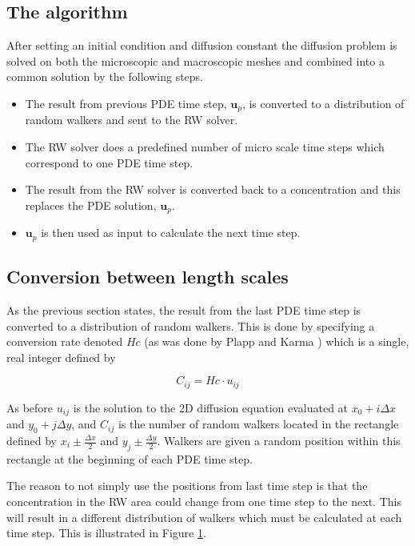 \subsection{The algorithm}
After setting an initial condition and diffusion constant the diffusion problem is solved on both the microscopic and macroscopic meshes and combined into a common solution by the following steps.
\begin{itemize}
 \item The result from previous PDE time step, $\mathbf{u}_p$, is converted to a distribution of random walkers and sent to the RW solver.
 \item The RW solver does a predefined number of micro scale time steps which correspond to one PDE time step.
 \item The result from the RW solver is converted back to a concentration and this replaces the PDE solution, $\mathbf{u}_p$.
 \item $\mathbf{u}_p$ is then used as input to calculate the next time step.
\end{itemize}

\subsection{Conversion between length scales}
As the previous section states, the result from the last PDE time step is converted to a distribution of random walkers. 
This is done by specifying a conversion rate denoted $Hc$ (as was done by Plapp and Karma \cite{plapp2000multiscale}) which is a single, real integer defined by

\begin{equation}\label{theory:Hc_definition}
 C_{ij} = Hc\cdot u_{ij}
\end{equation}

\noindent As before $u_{ij}$ is the solution to the 2D diffusion equation evaluated at $x_0 +i\Delta x$ and $y_0 +j\Delta y$, and $C_{ij}$ is the number of random walkers located in the rectangle defined by $x_i\pm\frac{\Delta x}{2}$ and $y_j\pm\frac{\Delta y}{2}$. 
Walkers are given a random position within this rectangle at the beginning of each PDE time step.

The reason to not simply use the positions from last time step is that the concentration in the RW area could change from one time step to the next. This will result in a different distribution of walkers which must be calculated at each time step. This is illustrated in Figure \ref{theory:concentration_update}.
\begin{figure}[h]
 \centering
 \caption{}
 \label{theory:concentration_update}
\end{figure}

